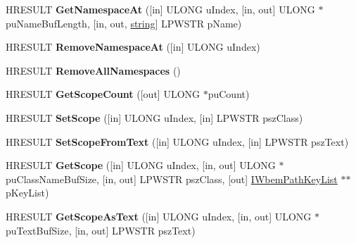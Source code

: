\begin{DoxyCompactItemize}
\item 
\mbox{\label{interface_i_wbem_path_a98797a40a723f855c3e8b8454a7c14f2}} 
H\+R\+E\+S\+U\+LT {\bfseries Get\+Namespace\+At} (\mbox{[}in\mbox{]} U\+L\+O\+NG u\+Index, \mbox{[}in, out\mbox{]} U\+L\+O\+NG $\ast$pu\+Name\+Buf\+Length, \mbox{[}in, out, \hyperlink{structstring}{string}\mbox{]} L\+P\+W\+S\+TR p\+Name)
\item 
\mbox{\label{interface_i_wbem_path_a0a5a9a22d461c311a38a5020a4a9eeac}} 
H\+R\+E\+S\+U\+LT {\bfseries Remove\+Namespace\+At} (\mbox{[}in\mbox{]} U\+L\+O\+NG u\+Index)
\item 
\mbox{\label{interface_i_wbem_path_a566db0c5d60b2591c9d48bd76abd2828}} 
H\+R\+E\+S\+U\+LT {\bfseries Remove\+All\+Namespaces} ()
\item 
\mbox{\label{interface_i_wbem_path_a56bfef76ad72f7fad4d1b39053357367}} 
H\+R\+E\+S\+U\+LT {\bfseries Get\+Scope\+Count} (\mbox{[}out\mbox{]} U\+L\+O\+NG $\ast$pu\+Count)
\item 
\mbox{\label{interface_i_wbem_path_a9db7556247d9ee64e6ce91c451385dba}} 
H\+R\+E\+S\+U\+LT {\bfseries Set\+Scope} (\mbox{[}in\mbox{]} U\+L\+O\+NG u\+Index, \mbox{[}in\mbox{]} L\+P\+W\+S\+TR psz\+Class)
\item 
\mbox{\label{interface_i_wbem_path_a3eb5f1de1d105dc25ddf703a2fee79de}} 
H\+R\+E\+S\+U\+LT {\bfseries Set\+Scope\+From\+Text} (\mbox{[}in\mbox{]} U\+L\+O\+NG u\+Index, \mbox{[}in\mbox{]} L\+P\+W\+S\+TR psz\+Text)
\item 
\mbox{\label{interface_i_wbem_path_a8eda5424c007422e4794658a35a20772}} 
H\+R\+E\+S\+U\+LT {\bfseries Get\+Scope} (\mbox{[}in\mbox{]} U\+L\+O\+NG u\+Index, \mbox{[}in, out\mbox{]} U\+L\+O\+NG $\ast$pu\+Class\+Name\+Buf\+Size, \mbox{[}in, out\mbox{]} L\+P\+W\+S\+TR psz\+Class, \mbox{[}out\mbox{]} \hyperlink{interface_i_wbem_path_key_list}{I\+Wbem\+Path\+Key\+List} $\ast$$\ast$p\+Key\+List)
\item 
\mbox{\label{interface_i_wbem_path_a461b0028e36a46bacc999a8d53ce5424}} 
H\+R\+E\+S\+U\+LT {\bfseries Get\+Scope\+As\+Text} (\mbox{[}in\mbox{]} U\+L\+O\+NG u\+Index, \mbox{[}in, out\mbox{]} U\+L\+O\+NG $\ast$pu\+Text\+Buf\+Size, \mbox{[}in, out\mbox{]} L\+P\+W\+S\+TR psz\+Text)
$$
\end{DoxyCompactItemize}
